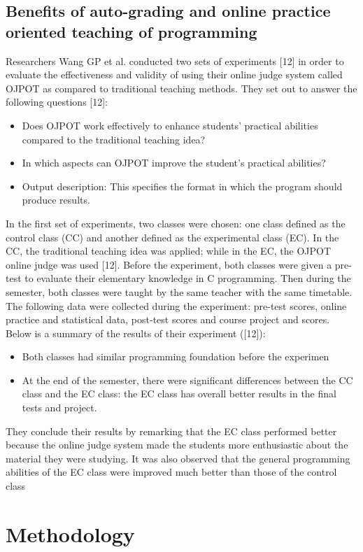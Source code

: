 \documentclass[12pt]{article}
\begin{document}
	\subsection{Benefits of auto-grading and online practice oriented teaching of programming}
		Researchers Wang GP et al. conducted two sets of experiments [12] in order to evaluate the
	effectiveness and validity of using their online judge system called OJPOT as compared to
	traditional teaching methods. They set out to answer the following questions [12]:
		\begin{itemize}
			\item  Does OJPOT work effectively to enhance students’ practical abilities compared to the
					traditional teaching idea?
			\item  In which aspects can OJPOT improve the student’s practical abilities?
			\item Output description: This specifies the format in which the program should produce
				results.
		\end{itemize}
		In the first set of experiments, two classes were chosen: one class defined as the control class (CC)
	and another defined as the experimental class (EC). In the CC, the traditional teaching idea was
	applied; while in the EC, the OJPOT online judge was used [12]. Before the experiment, both
	classes were given a pre-test to evaluate their elementary knowledge in C programming. Then
	during the semester, both classes were taught by the same teacher with the same timetable.
	The following data were collected during the experiment: pre-test scores, online practice and
	statistical data, post-test scores and course project and scores. Below is a summary of the results
	of their experiment ([12]):
		\begin{itemize}
			\item Both classes had similar programming foundation before the experimen
			\item At the end of the semester, there were significant differences between the CC class and
				the EC class: the EC class has overall better results in the final tests and project.
		\end{itemize}
		They conclude their results by remarking that the EC class performed better because the online
	judge system made the students more enthusiastic about the material they were studying. It was
	also observed that the general programming abilities of the EC class were improved much better
	than those of the control class


\section{Methodology}
\end{document}
